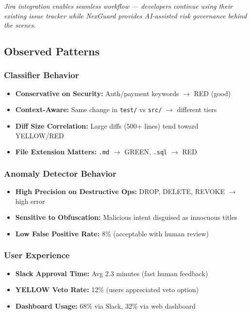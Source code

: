 \documentclass[11pt,a4paper]{article}
\begin{document}
\textit{Jira integration enables seamless workflow --- developers continue using their existing issue tracker while NexGuard provides AI-assisted risk governance behind the scenes.}

\newpage
\subsection{Observed Patterns}

\subsubsection{Classifier Behavior}
\begin{itemize}
    \item \textbf{Conservative on Security:} Auth/payment keywords $\rightarrow$ RED (good)
    \item \textbf{Context-Aware:} Same change in \texttt{test/} vs \texttt{src/} $\rightarrow$ different tiers
    \item \textbf{Diff Size Correlation:} Large diffs (500+ lines) tend toward YELLOW/RED
    \item \textbf{File Extension Matters:} \texttt{.md} $\rightarrow$ GREEN, \texttt{.sql} $\rightarrow$ RED
\end{itemize}

\subsubsection{Anomaly Detector Behavior}
\begin{itemize}
    \item \textbf{High Precision on Destructive Ops:} DROP, DELETE, REVOKE $\rightarrow$ high error
    \item \textbf{Sensitive to Obfuscation:} Malicious intent disguised as innocuous titles
    \item \textbf{Low False Positive Rate:} 8\% (acceptable with human review)
\end{itemize}

\subsubsection{User Experience}
\begin{itemize}
    \item \textbf{Slack Approval Time:} Avg 2.3 minutes (fast human feedback)
    \item \textbf{YELLOW Veto Rate:} 12\% (users appreciated veto option)
    \item \textbf{Dashboard Usage:} 68\% via Slack, 32\% via web dashboard
\end{itemize}
\end{document}
